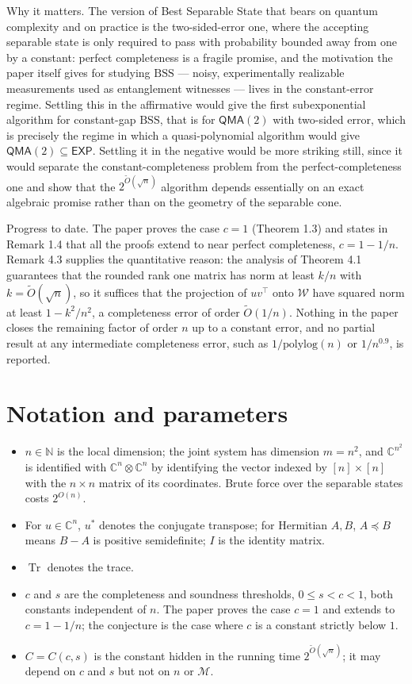 \documentclass{aicr-conjecture}
\newcommand{\BSS}{\mathrm{BSS}}
\newcommand{\tO}{\tilde{O}}
\newcommand{\Tr}{\operatorname{Tr}}
\newcommand{\CC}{\mathbb{C}}
\newcommand{\QMA}{\mathsf{QMA}}
\newcommand{\EXP}{\mathsf{EXP}}
\begin{document}
Why it matters. The version of Best Separable State that bears on
quantum complexity and on practice is the two-sided-error one, where the
accepting separable state is only required to pass with probability
bounded away from one by a constant: perfect completeness is a fragile
promise, and the motivation the paper itself gives for studying $\BSS$
--- noisy, experimentally realizable measurements used as entanglement
witnesses --- lives in the constant-error regime. Settling this in the
affirmative would give the first subexponential algorithm for
constant-gap $\BSS$, that is for $\QMA(2)$ with two-sided error, which
is precisely the regime in which a quasi-polynomial algorithm would give
$\QMA(2) \subseteq \EXP$. Settling it in the negative would be more
striking still, since it would separate the constant-completeness
problem from the perfect-completeness one and show that the
$2^{\tO(\sqrt{n})}$ algorithm depends essentially on an exact algebraic
promise rather than on the geometry of the separable cone.

Progress to date. The paper proves the case $c = 1$ (Theorem 1.3) and
states in Remark 1.4 that all the proofs extend to near perfect
completeness, $c = 1 - 1/n$. Remark 4.3 supplies the quantitative
reason: the analysis of Theorem 4.1 guarantees that the rounded rank one
matrix has norm at least $k/n$ with $k = \tO(\sqrt{n})$, so it suffices
that the projection of $uv^{\top}$ onto $\mathcal{W}$ have squared norm
at least $1 - k^{2}/n^{2}$, a completeness error of order $\tO(1/n)$.
Nothing in the paper closes the remaining factor of order $n$ up to a
constant error, and no partial result at any intermediate completeness
error, such as $1/\mathrm{polylog}(n)$ or $1/n^{0.9}$, is reported.

\section{Notation and parameters}\label{sec:notation}

\begin{itemize}
\item $n \in \mathbb{N}$ is the local dimension; the joint system has
  dimension $m = n^{2}$, and $\CC^{n^{2}}$ is identified with
  $\CC^{n} \otimes \CC^{n}$ by identifying the vector indexed by
  $[n] \times [n]$ with the $n \times n$ matrix of its coordinates.
  Brute force over the separable states costs $2^{O(n)}$.
\item For $u \in \CC^{n}$, $u^{*}$ denotes the conjugate transpose; for
  Hermitian $A, B$, $A \preceq B$ means $B - A$ is positive
  semidefinite; $I$ is the identity matrix.
\item $\Tr$ denotes the trace.
\item $c$ and $s$ are the completeness and soundness thresholds,
  $0 \le s < c < 1$, both constants independent of $n$. The paper proves
  the case $c = 1$ and extends to $c = 1 - 1/n$; the conjecture is the
  case where $c$ is a constant strictly below $1$.
\item $C = C(c,s)$ is the constant hidden in the running time
  $2^{\tO(\sqrt{n})}$; it may depend on $c$ and $s$ but not on $n$ or
  $\mathcal{M}$.
\end{itemize}
\end{document}
